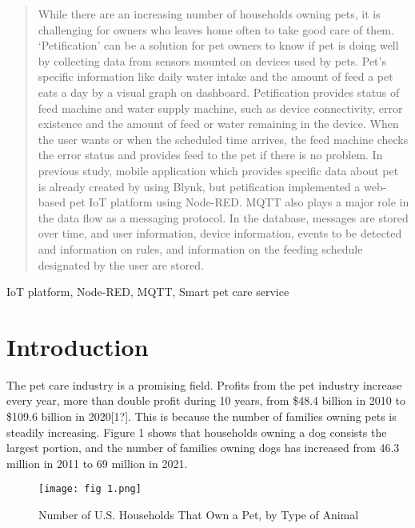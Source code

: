 \documentclass[conference]{IEEEtran}
\begin{document}
\begin{abstract}
While there are an increasing number of households owning pets, it is challenging for owners who leaves home often to take good care of them. ‘Petification’ can be a solution for pet owners to know if pet is doing well by collecting data from sensors mounted on devices used by pets. Pet’s specific information like daily water intake and the amount of feed a pet eats a day by a visual graph on dashboard. Petification provides status of feed machine and water supply machine, such as device connectivity, error existence and the amount of feed or water remaining in the device. When the user wants or when the scheduled time arrives, the feed machine checks the error status and provides feed to the pet if there is no problem. In previous study, mobile application which provides specific data about pet is already created by using Blynk, but petification implemented a web-based pet IoT platform using Node-RED. MQTT also plays a major role in the data flow as a messaging protocol. In the database, messages are stored over time, and user information, device information, events to be detected and information on rules, and information on the feeding schedule designated by the user are stored.
\end{abstract}
\hfill\break
\begin{IEEEkeywords}
IoT platform, Node-RED, MQTT, Smart pet care service 
\end{IEEEkeywords}
\section{Introduction}
The pet care industry is a promising field. Profits from the pet industry increase every year, more than double profit during 10 years, from \$48.4 billion in 2010 to \$109.6 billion in 2020[1?]. This is because the number of families owning pets is steadily increasing. Figure 1 shows that households owning a dog consists the largest portion, and the number of families owning dogs has increased from 46.3 million in 2011 to 69 million in 2021.

\begin{figure}[htbp]
\centerline{\texttt{[image: fig 1.png]}}
\caption{Number of U.S. Households That Own a Pet, by Type of Animal
}
\label{fig}
\end{figure}
\end{document}
